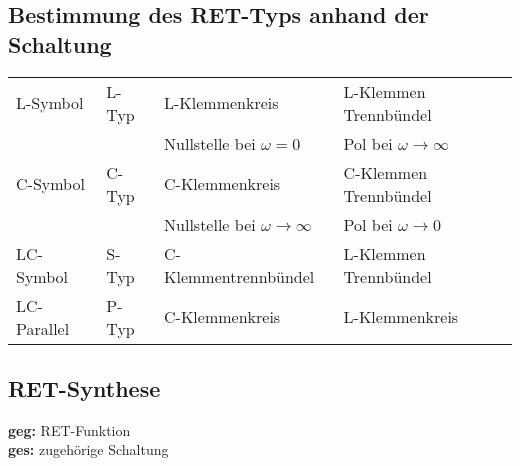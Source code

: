 \subsection{Bestimmung des RET-Typs anhand der Schaltung}
\begin{tabular}{llll}
L-Symbol & L-Typ & L-Klemmenkreis & L-Klemmen Trennbündel\\
& & Nullstelle bei $\omega = 0$ & Pol bei $\omega \rightarrow \infty$ \\
C-Symbol & C-Typ & C-Klemmenkreis & C-Klemmen Trennbündel\\
& & Nullstelle bei $\omega \rightarrow \infty$ & Pol bei $\omega \rightarrow
0$\\
LC-Symbol & S-Typ & C-Klemmentrennbündel & L-Klemmen Trennbündel\\
LC-Parallel & P-Typ & C-Klemmenkreis & L-Klemmenkreis\\
\end{tabular}

\subsection{RET-Synthese}

\textbf{geg:} RET-Funktion\\
\textbf{ges:} zugehörige Schaltung\\
